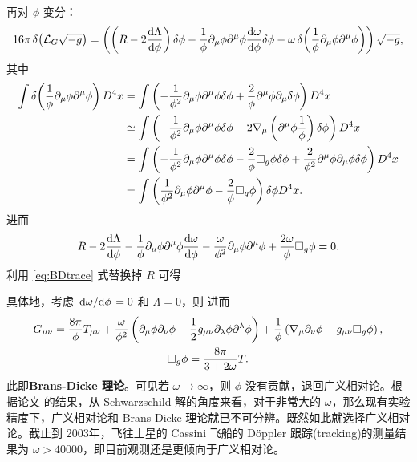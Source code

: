 再对 $\phi$ 变分：
\[16\pi\var(\mathcal L_G\sqrt{-g})= \left(\left(R-2\dv{\Lambda}{\phi}\right)\var\phi - \frac{1}{\phi}\partial_\mu \phi \partial^\mu \phi\dv{\omega}{\phi}\var\phi - \omega\var(\frac{1}{\phi}\partial_\mu \phi \partial^\mu \phi)\right) \sqrt{-g},\]
其中
\begin{align*}
    \int \var(\frac{1}{\phi}\partial_\mu \phi \partial^\mu \phi) D^4 x
    & =\int \left(-\frac{1}{\phi^2} \partial_\mu \phi \partial^\mu \phi \delta \phi+\frac{2}{\phi} \partial^\mu \phi  \partial_\mu \delta \phi\right) D^4 x \\
    & \simeq \int \left(-\frac{1}{\phi^2} \partial_\mu \phi \partial^\mu \phi \delta \phi-2 \nabla_\mu\left(\partial^\mu \phi \frac{1}{\phi}\right) \delta \phi\right) D^4 x \\
    & =\int\left(-\frac{1}{\phi^2} \partial_\mu \phi \partial^\mu \phi \delta \phi-\frac{2}{\phi} \square_g \phi \delta \phi+\frac{2}{\phi^2} \partial^\mu \phi \partial_\mu \phi \var\phi\right) D^4 x\\
    & =\int\left(\frac{1}{\phi^2} \partial_\mu \phi \partial^\mu \phi  - \frac{2}{\phi} \square_g \phi \right)\delta \phi D^4 x.
\end{align*}
进而
\[
    R-2\dv{\Lambda}{\phi}-\frac{1}{\phi}\partial_\mu \phi \partial^\mu \phi\dv{\omega}{\phi}- \frac{\omega}{\phi^2} \partial_\mu \phi \partial^\mu \phi  + \frac{2\omega}{\phi} \square_g \phi=0.
\]
利用 \eqref{eq:BDtrace} 式替换掉 $R$ 可得

具体地，考虑 $\dv*{\omega}{\phi}=0$ 和 $\Lambda=0$，则
进而
\begin{gather}
    G_{\mu \nu}=\frac{8 \pi}{\phi} T_{\mu \nu}+\frac{\omega}{\phi^2}\left(\partial_\mu \phi \partial_\nu \phi-\frac{1}{2} g_{\mu \nu} \partial_\lambda \phi \partial^\lambda \phi\right)+\frac{1}{\phi}\left(\nabla_\mu \partial_\nu \phi-g_{\mu \nu} \square_g \phi\right), \\
    \square_g\phi=\frac{8 \pi}{3+2 \omega} T.
\end{gather}
此即\textbf{Brans-Dicke 理论}。可见若 $\omega\to\infty$，则 $\phi$ 没有贡献，退回广义相对论。根据论文 \cite{Bhabra} 的结果，从 Schwarzschild 解的角度来看，对于非常大的 $\omega$，那么现有实验精度下，广义相对论和 Brans-Dicke 理论就已不可分辨。既然如此就选择广义相对论。截止到 2003年，飞往土星的 Cassini 飞船的 D\"oppler 跟踪(tracking)\cite{Will-thesis}的测量结果为 $\omega>40000$，即目前观测还是更倾向于广义相对论。

